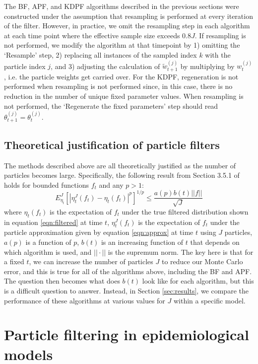 \documentclass{elsarticle}
\begin{document}
The BF, APF, and KDPF algorithms described in the previous sections were constructed under the assumption that resampling is performed at every iteration of the filter. However, in practice, we omit the resampling step in each algorithm at each time point where the effective sample size exceeds $0.8J$. If resampling is not performed, we modify the algorithm at that timepoint by 1) omitting the `Resample' step, 2) replacing all instances of the sampled index $k$ with the particle index $j$, and 3) adjusting the calculation of $\tilde{w}_{t+1}^{(j)}$ by multiplying by $w_t^{(j)}$, i.e. the particle weights get carried over. For the KDPF, regeneration is not performed when resampling is not performed since, in this case, there is no reduction in the number of unique fixed parameter values. When resampling is not performed, the `Regenerate the fixed parameters' step should read $\theta_{t+1}^{(j)} = \theta_t^{(j)}$.

\subsection{Theoretical justification of particle filters}

The methods described above are all theoretically justified as the number of particles becomes large. Specifically, the following result from Section 3.5.1 of \cite{del2004feynman} holds for bounded functions $f_t$ and any $p>1$:
\[ E_{\eta_t}^J \left[ \left| \eta_t^J(f_t)-\eta_t(f_t)\right|^p\right]^{1/p} \le \frac{a(p) b(t) ||f||}{\sqrt{J}} \]
where $\eta_t(f_t)$ is the expectation of $f_t$ under the true filtered distribution shown in equation \eqref{eqn:filtered} at time $t$, $\eta_t^J(f_t)$ is the expectation of $f_t$ under the particle approximation given by equation \eqref{eqn:approx} at time $t$ using $J$ particles, $a(p)$ is a function of $p$, $b(t)$ is an increasing function of $t$ that depends on which algorithm is used, and $||\cdot||$ is the supremum norm. The key here is that for a fixed $t$, we can increase the number of particles $J$ to reduce our Monte Carlo error, and this is true for all of the algorithms above, including the BF and APF. The question then becomes what does $b(t)$ look like for each algorithm, but this is a difficult question to answer. Instead, in Section \ref{sec:results}, we compare the performance of these algorithms at various values for $J$ within a specific model.

\section{Particle filtering in epidemiological models \label{sec:apply}}
\end{document}
